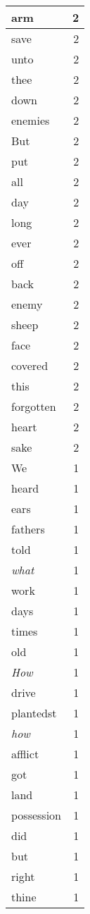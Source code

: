 \begin{center}
\begin{longtable}{l|r}
arm & 2 \\ \hline
save & 2 \\ \hline
unto & 2 \\ \hline
thee & 2 \\ \hline
down & 2 \\ \hline
enemies & 2 \\ \hline
But & 2 \\ \hline
put & 2 \\ \hline
all & 2 \\ \hline
day & 2 \\ \hline
long & 2 \\ \hline
ever & 2 \\ \hline
off & 2 \\ \hline
back & 2 \\ \hline
enemy & 2 \\ \hline
sheep & 2 \\ \hline
face & 2 \\ \hline
covered & 2 \\ \hline
this & 2 \\ \hline
forgotten & 2 \\ \hline
heart & 2 \\ \hline
sake & 2 \\ \hline
We & 1 \\ \hline
heard & 1 \\ \hline
ears & 1 \\ \hline
fathers & 1 \\ \hline
told & 1 \\ \hline
\emph{what} & 1 \\ \hline
work & 1 \\ \hline
days & 1 \\ \hline
times & 1 \\ \hline
old & 1 \\ \hline
\emph{How} & 1 \\ \hline
drive & 1 \\ \hline
plantedst & 1 \\ \hline
\emph{how} & 1 \\ \hline
afflict & 1 \\ \hline
got & 1 \\ \hline
land & 1 \\ \hline
possession & 1 \\ \hline
did & 1 \\ \hline
but & 1 \\ \hline
right & 1 \\ \hline
thine & 1 \\ \hline

\end{longtable}
\end{center}
